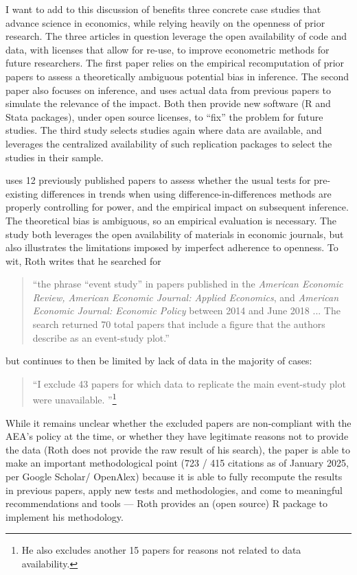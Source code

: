 \documentclass{Revue-economique}
\newcommand{\citep}{\parencite}
\newcommand{\citet}{\textcite}
\begin{document}
\begin{Article} [%
	Titre={Reproducibility and Open Science in Economics},
	Auteur={Lars Vilhuber\thanks{Cornell University, lars.vilhuber@cornell.edu}}]
\begin{refsection}[Main]
I want to add to this discussion of benefits three concrete case studies that advance science in economics, while relying heavily on the openness of prior research. The three articles in question  leverage the open availability of code and data, with licenses that allow for re-use, to improve econometric methods for future researchers. The first paper relies on the empirical recomputation of prior papers to assess a theoretically ambiguous potential bias in inference. The second paper also focuses on inference, and uses actual data from previous papers to simulate the relevance of the impact. Both then provide new software (R and Stata packages), under open source licenses, to ``fix'' the problem for future studies. The third study selects studies again where data are available, and leverages the centralized availability of such replication packages to select the studies in their sample. 

\citet{roth_pretest_2022}  uses 12 previously published papers to assess whether the usual tests for pre-existing differences in trends when using difference-in-differences methods are properly controlling for power, and the empirical impact on subsequent inference. The theoretical bias is ambiguous, so an empirical evaluation is necessary. The study both leverages the open availability of materials in economic journals, but also illustrates the limitations imposed by imperfect adherence to openness. To wit, Roth writes that he searched for 
%
\begin{quote}
``the phrase “event study” in papers published in the \textit{American Economic Review, American Economic Journal: Applied Economics}, and \textit{American Economic Journal: Economic Policy} between
2014 and June 2018 ... The search returned 70 total papers that include a figure that the authors describe as an event-study plot.''
\end{quote}
%
but continues to then be limited by lack of data in the majority of cases:

\begin{quote}
    ``I exclude 43 papers for which data to replicate the main event-study plot were unavailable. \citep[pg. 307]{roth_pretest_2022}''\footnote{He also excludes another 15 papers for reasons not related to data availability.}
\end{quote}

While it remains unclear whether the excluded papers are non-compliant with the AEA's policy at the time, or whether they have legitimate reasons not to provide the data (Roth does not provide the raw result of his search), the paper is able to make an important methodological point (723 / 415 citations as of January 2025, per Google Scholar/ OpenAlex) because it is able to fully recompute the results in previous papers, apply new tests and methodologies, and come to meaningful recommendations and tools --- Roth provides an (open source) R package to implement his methodology.


\end{refsection}
\end{Article}
\end{document}
